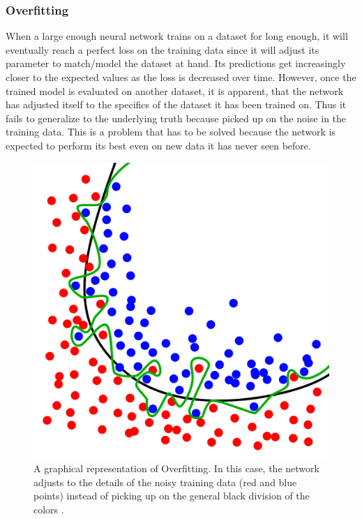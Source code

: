 \documentclass[a4paper,10pt]{scrartcl}
\begin{document}
\subsubsection*{Overfitting}

When a large enough neural network trains on a dataset for long enough, it will eventually reach a perfect loss on the training data since it will adjust its parameter to match/model the dataset at hand.
Its predictions get increasingly closer to the expected values as the loss is decreased over time.
However, once the trained model is evaluated on another dataset, it is apparent, that the network has adjusted itself to the specifics of the dataset it has been trained on.
Thus it fails to generalize to the underlying truth because picked up on the noise in the training data.
This is a problem that has to be solved because the network is expected to perform its best even on new data it has never seen before.

\begin{figure}[h]
    \includegraphics[scale=0.15]{images/Overfitting.svg.png}
    \centering
    \caption{A graphical representation of Overfitting. In this case, the network adjusts to the details of the noisy training data (red and blue points) instead of picking up on the general black division of the colors \cite{wiki:Overfitting}.}
    \label{fig:overfitting}
\end{figure}
\end{document}

